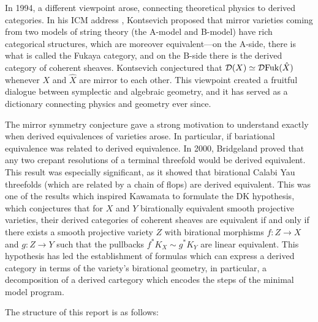 In 1994, a different viewpoint arose, connecting theoretical physics to derived categories. In his ICM address \cite{kontsevich_homological_1994}, Kontsevich proposed that mirror varieties coming from two models of string theory (the A-model and B-model) have rich categorical structures, which are moreover equivalent---on the A-side, there is what is called the Fukaya category, and on the B-side there is the derived category of coherent sheaves. Kontsevich conjectured that $\mathcal{D}(X)\simeq \mathcal{D} \mathrm{Fuk}(\hat{X})$ whenever $X$ and $\hat{X}$ are mirror to each other. This viewpoint created a fruitful dialogue between symplectic and algebraic geometry, and it has served as a dictionary connecting physics and geometry ever since.

The mirror symmetry conjecture gave a strong motivation to understand exactly when derived equivalences of varieties arose. In particular, if bariational equivalence was related to derived equivalence. In 2000, Bridgeland proved that any two crepant resolutions of a terminal threefold would be derived equivalent. This result was especially significant, as it showed that birational Calabi Yau threefolds (which are related by a chain of flops) are derived equivalent. This was one of the results which inspired Kawamata to formulate the DK hypothesis, which conjectures that for $X$ and $Y$ birationally equivalent smooth projective varieties, their derived categories of coherent sheaves are equivalent if and only if there exists a smooth projective variety $Z$ with birational morphisms $f: Z \to X$ and $g: Z\to Y$ such that the pullbacks $f^{*}K_{X}\sim g^{*}K_{Y}$ are linear equivalent. This hypothesis has led the establishment of formulas which can express a derived category in terms of the variety's birational geometry, in particular, a decomposition of a derived cartegory which encodes the steps of the minimal model program.  

The structure of this report is as follows: 

